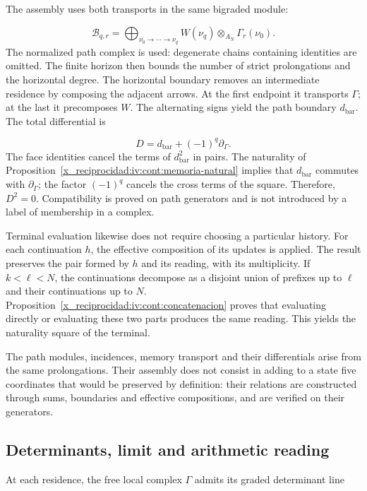 The assembly uses both transports in the same bigraded module:

\[
\mathcal B_{q,r}=
\bigoplus_{\nu_0\to\cdots\to\nu_q}
W(\nu_q)\otimes_{A_N}\Gamma_r(\nu_0).
\]
The normalized path complex is used: degenerate chains containing identities are omitted. The finite horizon then bounds the number of strict prolongations and the horizontal degree. The horizontal boundary removes an intermediate residence by composing the adjacent arrows. At the first endpoint it transports \(\Gamma\); at the last it precomposes \(W\). The alternating signs yield the path boundary \(d_{\mathrm{bar}}\). The total differential is

\[
D=d_{\mathrm{bar}}+(-1)^q\partial_\Gamma.
\]
The face identities cancel the terms of \(d_{\mathrm{bar}}^2\) in pairs. The naturality of Proposition~\ref{x_reciprocidad:iv:cont:memoria-natural} implies that \(d_{\mathrm{bar}}\) commutes with \(\partial_\Gamma\); the factor \((-1)^q\) cancels the cross terms of the square. Therefore, \(D^2=0\). Compatibility is proved on path generators and is not introduced by a label of membership in a complex.

Terminal evaluation likewise does not require choosing a particular history. For each continuation \(h\), the effective composition of its updates is applied. The result preserves the pair formed by \(h\) and its reading, with its multiplicity. If \(k<\ell<N\), the continuations decompose as a disjoint union of prefixes up to \(\ell\) and their continuations up to \(N\). Proposition~\ref{x_reciprocidad:iv:cont:concatenacion} proves that evaluating directly or evaluating these two parts produces the same reading. This yields the naturality square of the terminal.

The path modules, incidences, memory transport and their differentials arise from the same prolongations. Their assembly does not consist in adding to a state five coordinates that would be preserved by definition: their relations are constructed through sums, boundaries and effective compositions, and are verified on their generators.

\subsection{Determinants, limit and arithmetic reading}
\label{x_reciprocidad:iv:cont:determinantes}
At each residence, the free local complex \(\Gamma\) admits its graded determinant line


